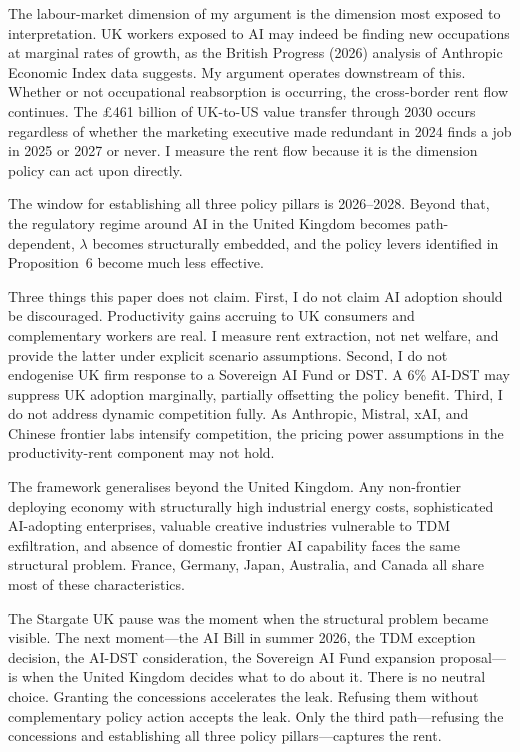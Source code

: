 \documentclass[11pt,letterpaper]{article}
\theoremstyle{remark}
\begin{document}
The labour-market dimension of my argument is the dimension most exposed to interpretation. {UK} workers exposed to {AI} may indeed be finding new occupations at marginal rates of growth, as the British Progress (2026) analysis of {Anthropic Economic Index} data suggests. My argument operates downstream of this. Whether or not occupational reabsorption is occurring, the cross-border rent flow continues. The \pounds461 billion of {UK}-to-{US} value transfer through 2030 occurs regardless of whether the marketing executive made redundant in 2024 finds a job in 2025 or 2027 or never. I measure the rent flow because it is the dimension policy can act upon directly.

The window for establishing all three policy pillars is 2026--2028. Beyond that, the regulatory regime around {AI} in the United Kingdom becomes path-dependent, $\lambda$ becomes structurally embedded, and the policy levers identified in Proposition~6 become much less effective.

Three things this paper does not claim. First, I do not claim {AI} adoption should be discouraged. Productivity gains accruing to {UK} consumers and complementary workers are real. I measure rent extraction, not net welfare, and provide the latter under explicit scenario assumptions. Second, I do not endogenise {UK} firm response to a Sovereign {AI} Fund or {DST}. A 6\% {AI}-{DST} may suppress {UK} adoption marginally, partially offsetting the policy benefit. Third, I do not address dynamic competition fully. As {Anthropic}, {Mistral}, {xAI}, and Chinese frontier labs intensify competition, the pricing power assumptions in the productivity-rent component may not hold.

The framework generalises beyond the United Kingdom. Any non-frontier deploying economy with structurally high industrial energy costs, sophisticated {AI}-adopting enterprises, valuable creative industries vulnerable to {TDM} exfiltration, and absence of domestic frontier {AI} capability faces the same structural problem. France, Germany, Japan, Australia, and Canada all share most of these characteristics.

The Stargate {UK} pause was the moment when the structural problem became visible. The next moment---the {AI} Bill in summer 2026, the {TDM} exception decision, the {AI}-{DST} consideration, the Sovereign {AI} Fund expansion proposal---is when the United Kingdom decides what to do about it. There is no neutral choice. Granting the concessions accelerates the leak. Refusing them without complementary policy action accepts the leak. Only the third path---refusing the concessions and establishing all three policy pillars---captures the rent.
\end{document}
